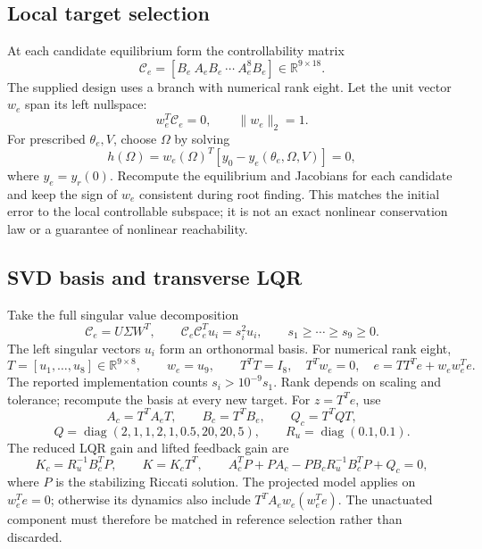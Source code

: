\documentclass[10pt]{article}
\numberwithin{equation}{section}
\begin{document}
\subsection{Local target selection}
At each candidate equilibrium form the controllability matrix
\begin{equation}
\mathcal C_e=[B_e\ A_eB_e\ \cdots\ A_e^8B_e]\in\mathbb R^{9\times18}.
\end{equation}
The supplied design uses a branch with numerical rank eight. Let the unit
vector $w_e$ span its left nullspace:
\begin{equation}
w_e^T\mathcal C_e=0,\qquad \|w_e\|_2=1.
\end{equation}
For prescribed $\theta_e,V$, choose $\Omega$ by solving
\begin{equation}
\boxed{h(\Omega)=w_e(\Omega)^T[y_0-y_e(\theta_e,\Omega,V)]=0,}
\end{equation}
where $y_e=y_r(0)$. Recompute the equilibrium and Jacobians for each candidate
and keep the sign of $w_e$ consistent during root finding. This matches the
initial error to the local controllable subspace; it is not an exact nonlinear
conservation law or a guarantee of nonlinear reachability.

\subsection{SVD basis and transverse LQR}
Take the full singular value decomposition
\begin{equation}
\mathcal C_e=U\Sigma W^T,\qquad
\mathcal C_e\mathcal C_e^T u_i=s_i^2u_i,\qquad
s_1\ge\cdots\ge s_9\ge0.
\end{equation}
The left singular vectors $u_i$ form an orthonormal basis. For numerical rank eight,
\begin{equation}
T=[u_1,\ldots,u_8]\in\mathbb R^{9\times8},\qquad w_e=u_9,\qquad
T^TT=I_8,\quad T^Tw_e=0,\quad e=TT^Te+w_ew_e^Te.
\end{equation}
The reported implementation counts $s_i>10^{-9}s_1$. Rank depends on scaling
and tolerance; recompute the basis at every new target.
For $z=T^Te$, use
\begin{equation}
A_c=T^TA_eT,\qquad B_c=T^TB_e,\qquad Q_c=T^TQT,
\end{equation}
\begin{equation}
Q=\operatorname{diag}(2,1,1,2,1,0.5,20,20,5),\qquad
R_u=\operatorname{diag}(0.1,0.1).
\end{equation}
The reduced LQR gain and lifted feedback gain are
\begin{equation}
K_c=R_u^{-1}B_c^TP,\qquad K=K_cT^T,\qquad
A_c^TP+PA_c-PB_cR_u^{-1}B_c^TP+Q_c=0,
\end{equation}
where $P$ is the stabilizing Riccati solution. The projected model applies on
$w_e^Te=0$; otherwise its dynamics also include
$T^TA_ew_e(w_e^Te)$. The unactuated component must therefore be matched in
reference selection rather than discarded.
\end{document}
